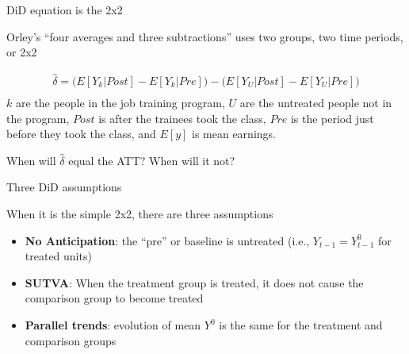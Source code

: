 \documentclass{beamer}
\begin{document}
\begin{frame}{DiD equation is the 2x2}

Orley's ``four averages and three subtractions'' uses two groups, two time periods, or 2x2

\begin{eqnarray*}
\widehat{\delta} = \bigg ( E[Y_k|Post] - E[Y_k|Pre] \bigg ) - \bigg ( E[Y_U | Post ] - E[ Y_U | Pre] \bigg) \\
\end{eqnarray*}$k$ are the people in the job training program, $U$ are the untreated people not in the program, $Post$ is after the trainees took the class, $Pre$ is the period just before they took the class, and $E[y]$ is mean earnings. 

\bigskip

When will $\widehat{\delta}$ equal the ATT?  When will it not?

\end{frame}

\begin{frame}{Three DiD assumptions}

When it is the simple 2x2, there are three assumptions
\begin{itemize}
\item \textbf{No Anticipation}:  the ``pre'' or baseline is untreated (i.e., $Y_{t-1} = Y^0_{t-1}$ for treated units)
\item \textbf{SUTVA}: When the treatment group is treated, it does not cause the comparison group to become treated
\item \textbf{Parallel trends}:  evolution of mean $Y^0$ is the same for the treatment and comparison groups
\end{itemize}

\end{frame}
\end{document}
